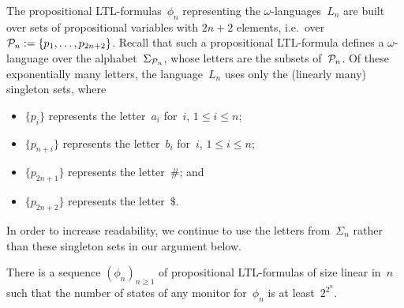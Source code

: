 The propositional LTL-formulas~$\phi_n$ representing the
$\omega$-languages~$L_n$ are built over sets of propositional variables with
$2n+2$ elements, i.e.~over $\mathcal{P}_n:=\{p_1,\dots,p_{2n+2}\}$.
%
Recall that such a propositional LTL-formula defines a $\omega$-language over
the alphabet~$\Sigma_{\mathcal{P}_n}$, whose letters are the subsets of~$\mathcal{P}_n$.  Of
these exponentially many letters, the language~$L_n$ uses only the (linearly
many) singleton sets, where
\begin{itemize}
    \item $\{p_i\}$ represents the letter~$a_i$ for~$i$, $1\le i\le n$;
    \item $\{p_{n+i}\}$ represents the letter~$b_i$ for~$i$, $1\le i\le n$;
    \item $\{p_{2n+1}\}$ represents the letter~$\#$; and
    \item $\{p_{2n+2}\}$ represents the letter~$\$$.
\end{itemize}

\noindent
In order to increase readability, we continue to use the letters from~$\Sigma_n$
rather than these singleton sets in our argument below.

\begin{theorem}\label{thm:monitor-size}
    There is a sequence $(\phi_n)_{n\ge 1}$ of propositional LTL-formulas of
    size linear in~$n$ such that the number of states of any monitor
    for~$\phi_n$ is at least~$2^{2^n}$.
\end{theorem}


